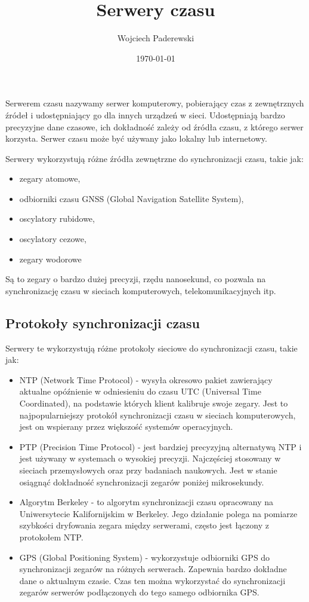 \documentclass[../main.tex]{subfiles}
\author{Wojciech Paderewski}
\date{\today}
\title{Serwery czasu}
\begin{document}
Serwerem czasu nazywamy serwer komputerowy, pobierający czas z zewnętrznych źródeł i udostępniający go dla innych urządzeń w sieci.
Udostępniają bardzo precyzyjne dane czasowe, ich dokładność zależy od źródła czasu, z którego serwer korzysta. Serwer czasu może być używany jako lokalny lub internetowy.

Serwery wykorzystują różne źródła zewnętrzne do synchronizacji czasu, takie jak:
\begin{itemize}
  \item zegary atomowe,
  \item odbiorniki czasu GNSS (Global Navigation Satellite System),
  \item oscylatory rubidowe,
  \item oscylatory cezowe,
  \item zegary wodorowe
\end{itemize}

Są to zegary o bardzo dużej precyzji, rzędu nanosekund, co pozwala na synchronizację czasu w sieciach komputerowych, telekomunikacyjnych itp.

\subsection{Protokoły synchronizacji czasu}
Serwery te wykorzystują różne protokoły sieciowe do synchronizacji czasu, takie jak:
\begin{itemize}
  \item NTP (Network Time Protocol) - 
  wysyła okresowo pakiet zawierający aktualne opóźnienie w odniesieniu do czasu UTC (Universal Time Coordinated), na podstawie których klient kalibruje swoje zegary.
  Jest to najpopularniejszy protokół synchronizacji czasu w sieciach komputerowych, jest on wspierany przez większość systemów operacyjnych.
  \item PTP (Precision Time Protocol) - 
  jest bardziej precyzyjną alternatywą NTP i jest używany w systemach o wysokiej precyzji. Najczęściej stosowany w sieciach przemysłowych oraz przy badaniach naukowych. 
  Jest w stanie osiągnąć dokładność synchronizacji zegarów poniżej mikrosekundy.
  \item Algorytm Berkeley - to algorytm synchronizacji czasu opracowany na Uniwersytecie Kalifornijskim w Berkeley. 
  Jego działanie polega na pomiarze szybkości dryfowania zegara między serwerami, często jest łączony z protokołem NTP.
  \item GPS (Global Positioning System) -  wykorzystuje odbiorniki GPS do synchronizacji zegarów na różnych serwerach.
   Zapewnia bardzo dokładne dane o aktualnym czasie. Czas ten można wykorzystać do synchronizacji
  zegarów serwerów podłączonych do tego samego odbiornika GPS. 
\end{itemize}
\end{document}
